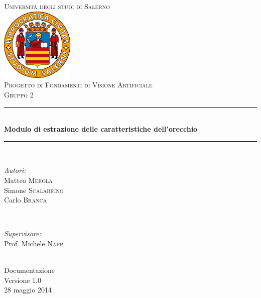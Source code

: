 \documentclass[a4paper, 12pt, italian]{report}
\begin{document}
\begin{titlepage}
\newcommand{\HRule}{\rule{\linewidth}{0.5mm}} 
\center 
\textsc{\LARGE Università degli studi di Salerno}\\[1cm] 
\includegraphics[width=3.5cm]{img/logo.jpg} \\[1cm]
\textsc{\large Progetto di Fondamenti di Visione Artificiale}\\[0.5cm]
\textsc{\Large Gruppo 2}\\[0.5cm] 
 \HRule \\[0.4cm]
{ \large \bfseries Modulo di estrazione delle caratteristiche dell'orecchio}\\[0.4cm] 
\HRule \\[1.5cm]

\begin{minipage}{0.4\textwidth}
\begin{flushleft} \large
\emph{Autori:}\\
Matteo \textsc{Merola}\\
Simone \textsc{Scalabrino}\\
Carlo \textsc{Branca}\\
\end{flushleft}
\end{minipage}
~
\begin{minipage}{0.4\textwidth}
\begin{flushright} \large
\emph{Supervisore:} \\
Prof. Michele \textsc{Nappi}
\end{flushright}
\end{minipage}\\[2.5cm]


{\Large Documentazione}\\
Versione 1.0\\[1cm]

{\large 28 maggio 2014} %

\vfill

\end{titlepage}		
	\setcounter{tocdepth}{1}	
	\tableofcontents
	
	
	
	
	
\end{document}
